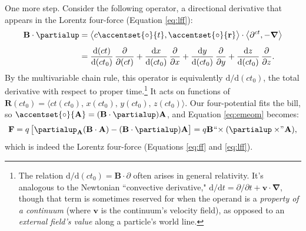 \documentclass[12pt]{article}
\renewcommand{\mathring}[1]{\accentset{\circ}{#1}}
\renewcommand{\vv}[1]{\mathbf{#1}}
\newcommand{\dd}[1]{\mathrm{d}#1}
\newcommand{\del}{\boldsymbol{\nabla}}
\begin{document}
One more step. Consider the following operator, a directional derivative that appears in the Lorentz four-force (Equation \ref{eq:lff}):
\begin{equation*}
\begin{split}
\vv B \cdot \partialup &= \big \langle c \mathring{t}, \mathring{\vv r} \big \rangle \cdot \left \langle \partial^{ct}, - \del \right \rangle \\[4pt]
&= \dfrac{\dd (ct)}{\dd (ct_0)} \, \dfrac{\partial}{\partial (ct)} + \dfrac{\dd x}{\dd (ct_0)} \, \dfrac{\partial}{\partial x} +  \dfrac{\dd y}{\dd (ct_0)} \, \dfrac{\partial}{\partial y} + \dfrac{\dd z}{\dd (ct_0)} \, \dfrac{\partial}{\partial z} .
\end{split}
\end{equation*}
By the multivariable chain rule, this operator is equivalently $\dd / \dd (ct_0)$, the total derivative with respect to proper time.\footnote{The relation $\dd / \dd (ct_0) = \vv B \cdot \partialup$ often arises in general relativity. It's analogous to the Newtonian ``convective derivative," ${\dd / \dd t = \partial / \partial t + \vv v \cdot \del}$, though that term is sometimes reserved for when the operand is a \emph{property of a continuum} (where $\vv v$ is the continuum's velocity field), as opposed to an \emph{external field's value} along a particle's world line.} It acts on functions of ${\vv R (ct_0) = \langle ct (ct_0), \, x (ct_0), \, y (ct_0), \, z (ct_0) \rangle}$. Our four-potential fits the bill, so $\mathring{\vv A} = (\vv B \cdot \partialup) \vv A $, and Equation \ref{eq:emeom} becomes:
\begin{equation*}
\vv F = q \, \bigl[ \partialup_{\vv A} (\vv B \cdot \vv A) - (\vv B \cdot \partialup) \vv A \bigr] = q \vv B \mkern1mu `` \mkern-4mu \times (\partialup \times \mkern-4mu " \mkern1mu \vv A) ,
\end{equation*}
which is indeed the Lorentz four-force (Equations \ref{eq:ff} and \ref{eq:lff}).
\end{document}

